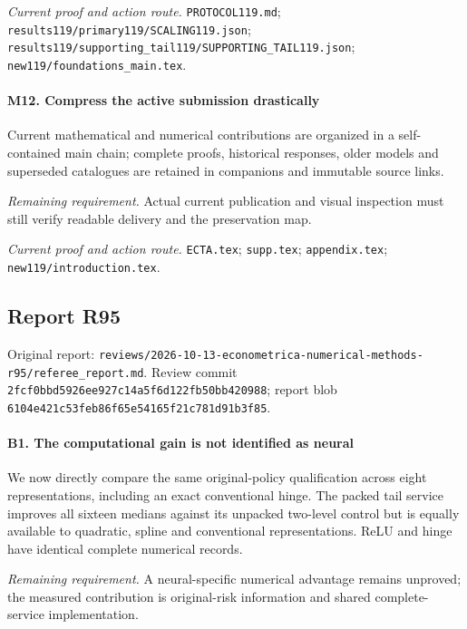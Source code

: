 \par\emph{Current proof and action route.} \nolinkurl{PROTOCOL119.md}; \nolinkurl{results119/primary119/SCALING119.json}; \nolinkurl{results119/supporting_tail119/SUPPORTING_TAIL119.json}; \nolinkurl{new119/foundations_main.tex}.

\paragraph{M12. Compress the active submission drastically}

Current mathematical and numerical contributions are organized in a self-contained main chain; complete proofs, historical responses, older models and superseded catalogues are retained in companions and immutable source links.

\par\emph{Remaining requirement.} Actual current publication and visual inspection must still verify readable delivery and the preservation map.

\par\emph{Current proof and action route.} \nolinkurl{ECTA.tex}; \nolinkurl{supp.tex}; \nolinkurl{appendix.tex}; \nolinkurl{new119/introduction.tex}.

\subsection{Report R95}

Original report: \nolinkurl{reviews/2026-10-13-econometrica-numerical-methods-r95/referee_report.md}. Review commit \nolinkurl{2fcf0bbd5926ee927c14a5f6d122fb50bb420988}; report blob \nolinkurl{6104e421c53feb86f65e54165f21c781d91b3f85}.

\paragraph{B1. The computational gain is not identified as neural}

We now directly compare the same original-policy qualification across eight representations, including an exact conventional hinge. The packed tail service improves all sixteen medians against its unpacked two-level control but is equally available to quadratic, spline and conventional representations. ReLU and hinge have identical complete numerical records.

\par\emph{Remaining requirement.} A neural-specific numerical advantage remains unproved; the measured contribution is original-risk information and shared complete-service implementation.

